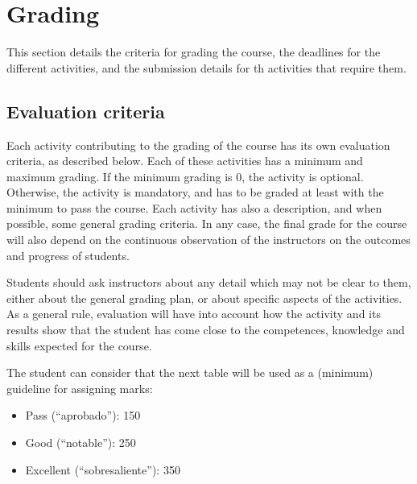 \documentclass[a4paper]{article}
\begin{document}
\section{Grading}

This section details the criteria for grading the course, the deadlines for the different activities, and the submission details for th activities that require them.

\subsection{Evaluation criteria}
\label{sub:evaluation-criteria}

Each activity contributing to the grading of the course has its own evaluation criteria, as described below. Each of these activities has a minimum and maximum grading. If the minimum grading is 0, the activity is optional. Otherwise, the activity is mandatory, and has to be graded at least with the minimum to pass the course. Each activity has also a description, and when possible, some general grading criteria. In any case, the final grade for the course will also depend on the continuous observation of the instructors on the outcomes and progress of students.

Students should ask instructors about any detail which may not be clear to them, either about the general grading plan, or about specific aspects of the activities. As a general rule, evaluation will have into account how the activity and its results show that the student has come close to the competences, knowledge and skills expected for the course.

The student can consider that the next table will be used as a (minimum) guideline for assigning marks:

\begin{itemize}
\item Pass (``aprobado''): 150
\item Good (``notable''): 250
\item Excellent (``sobresaliente''): 350
\end{itemize}
\end{document}
